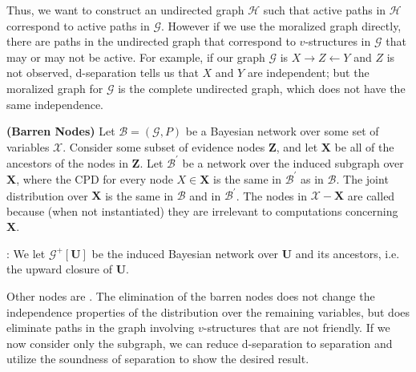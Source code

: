 \documentclass{article}
\newcommand{\bfs}[1]{\textbf{({#1}) }}
\begin{document}
Thus, we want to construct an undirected graph $\mathcal{H}$ such that active paths in $\mathcal{H}$ correspond to active paths in $\mathcal{G}$. However if we use the moralized graph directly, there are paths in the undirected graph that correspond to $v$-structures in $\mathcal{G}$ that may or may not be active. For example, if our graph $\mathcal{G}$ is $X \rightarrow Z \leftarrow Y$ and $Z$ is not observed, d-separation tells us that $X$ and $Y$ are independent; but the moralized graph for $\mathcal{G}$ is the complete undirected graph, which does not have the same independence.

\begin{defa}\bfs{Barren Nodes}
Let $\mathcal{B}=(\mathcal{G}, P)$ be a Bayesian network over some set of variables $\mathcal{X}$. Consider some subset of evidence nodes $\boldsymbol{Z}$, and let $\boldsymbol{X}$ be all of the ancestors of the nodes in $\boldsymbol{Z}$. Let $\mathcal{B}^{\prime}$ be a network over the induced subgraph over $\boldsymbol{X}$, where the CPD for every node $X \in \boldsymbol{X}$ is the same in $\mathcal{B}^{\prime}$ as in $\mathcal{B}$. The joint distribution over $\boldsymbol{X}$ is the same in $\mathcal{B}$ and in $\mathcal{B}^{\prime}$. The nodes in $\mathcal{X}-\boldsymbol{X}$ are called  because (when not instantiated) they are irrelevant to computations concerning $\boldsymbol{X}$.
\end{defa}



: We let $\mathcal{G}^{+}[\boldsymbol{U}]$ be the induced Bayesian network over $\boldsymbol{U}$ and its ancestors, i.e. the upward closure of $\boldsymbol{U}$.
\begin{rema}%
Other nodes are . The elimination of the barren nodes does not change the independence properties of the distribution over the remaining variables, but does eliminate paths in the graph involving $v$-structures that are not friendly. If we now consider only the subgraph, we can reduce d-separation to separation and utilize the soundness of separation to show the desired result.
\end{rema}
\end{document}
